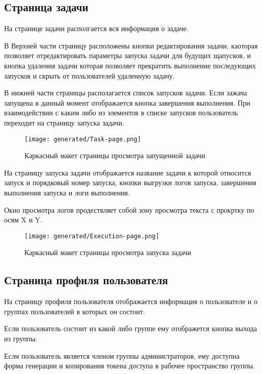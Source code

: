 \subsection{Страница задачи}

На странице задачи располгается вся информация о задаче.

В Верхней части страницу расположены кнопки редактирования задачи, каоторая позволяет отредактировать параметры запуска задачи для будущих щапусков, и кнопка удаления задачи которая позволяет прекратить выполнение последующих запусков и скрыть от пользователей удаленную задачу.

В нижней части страницы располагается список запусков задачи. Если зажача запущена в данный момент отображается кнопка завершения выполнения. При взаимодействии с каким либо из элементов в списке запусков пользователь переходит на страницу запуска задачи.

\begin{figure*}[!t]
  \centering
  \texttt{[image: generated/Task-page.png]}
  \caption{Каркасный макет страницы просмотра запущенной задачи}
  \label{Task-page}
\end{figure*}

На страницу запуска задачи отображается название задачи к которой относится запуск и порядковый номер запуска, кнопки выгрузки логов запуска, завершения выполнения запуска и логи выполнения. 

Окно просмотра логов продествляет собой зону просмотра текста с прокртку по осям X и Y.

\begin{figure*}[!t]
  \centering
  \texttt{[image: generated/Execution-page.png]}
  \caption{Каркасный макет страницы просмотра запуска задачи}
  \label{Execution-page}
\end{figure*}

\subsection{Страница профиля пользователя}

На страницу профиля пользователя отображается информация о пользователе и о группах пользователей в которых он состоит.

Если пользователь состоит из какой либо группе ему отображется кнопка выхода из группы.

Если пользователь является членом группы администраторов, ему доступна форма генерации и копирования токена доступа в рабочее пространство группы.


